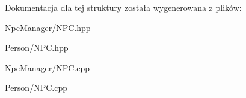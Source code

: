 Dokumentacja dla tej struktury została wygenerowana z plików\-:\begin{DoxyCompactItemize}
\item 
Npc\-Manager/N\-P\-C.\-hpp\item 
Person/N\-P\-C.\-hpp\item 
Npc\-Manager/N\-P\-C.\-cpp\item 
Person/N\-P\-C.\-cpp\end{DoxyCompactItemize}
